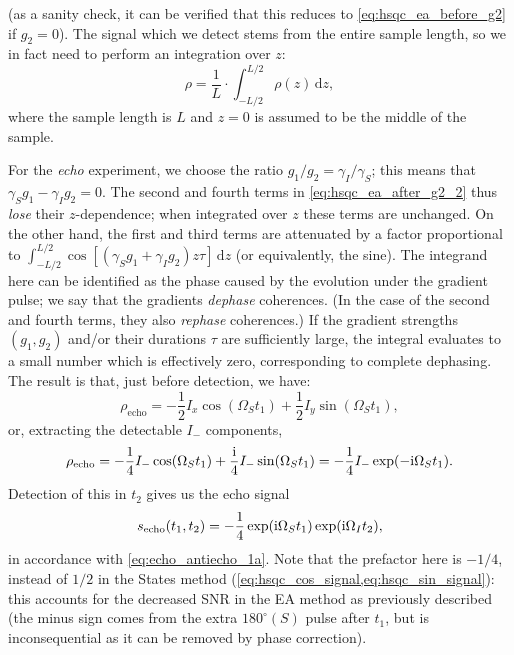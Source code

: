 (as a sanity check, it can be verified that this reduces to \cref{eq:hsqc_ea_before_g2} if $g_2 = 0$).
The signal which we detect stems from the entire sample length, so we in fact need to perform an integration over $z$:
\begin{equation}
    \label{eq:density_operator_integration}
    \rho = \frac{1}{L} \cdot \int_{-L/2}^{L/2} \rho(z) \,\mathrm{d}z,
\end{equation}
where the sample length is $L$ and $z=0$ is assumed to be the middle of the sample.

For the \textit{echo} experiment, we choose the ratio $g_1/g_2 = \gamma_I/\gamma_S$; this means that $\gamma_S g_1 - \gamma_I g_2 = 0$.
The second and fourth terms in \cref{eq:hsqc_ea_after_g2_2} thus \textit{lose} their $z$-dependence; when integrated over $z$ these terms are unchanged.
On the other hand, the first and third terms are attenuated by a factor proportional to $\int_{-L/2}^{L/2} \cos[(\gamma_S g_1 + \gamma_I g_2)z\tau]\,\mathrm{d}z$ (or equivalently, the sine).
The integrand here can be identified as the phase caused by the evolution under the gradient pulse; we say that the gradients \textit{dephase} coherences. (In the case of the second and fourth terms, they also \textit{rephase} coherences.)
If the gradient strengths $(g_1, g_2)$ and/or their durations $\tau$ are sufficiently large, the integral evaluates to a small number which is effectively zero, corresponding to complete dephasing.
The result is that, just before detection, we have:
\begin{equation}
    \label{eq:hsqc_ea_echo_cartesian}
    \rho_\text{echo} = -\frac{1}{2}I_x\cos(\Omega_S t_1) + \frac{1}{2}I_y\sin(\Omega_S t_1),
\end{equation}
or, extracting the detectable $I_-$ components,
\begin{equation}
    \label{eq:hsqc_ea_echo_detectable}
    \rho_\text{echo} = -\frac{1}{4}I_-\cos(\Omega_S t_1) + \frac{\mathrm{i}}{4}I_-\sin(\Omega_S t_1) = -\frac{1}{4}I_-\exp(-\mathrm{i}\Omega_S t_1).
\end{equation}
Detection of this in $t_2$ gives us the echo signal
\begin{equation}
    \label{eq:hsqc_ea_echo_signal}
    s_\text{echo}(t_1, t_2) = -\frac{1}{4}\exp(\mathrm{i} \Omega_S t_1)\exp(\mathrm{i} \Omega_I t_2),
\end{equation}
in accordance with \cref{eq:echo_antiecho_1a}.
Note that the prefactor here is $-1/4$, instead of $1/2$ in the States method (\cref{eq:hsqc_cos_signal,eq:hsqc_sin_signal}): this accounts for the decreased SNR in the EA method as previously described (the minus sign comes from the extra $180^\circ(S)$ pulse after $t_1$, but is inconsequential as it can be removed by phase correction).

